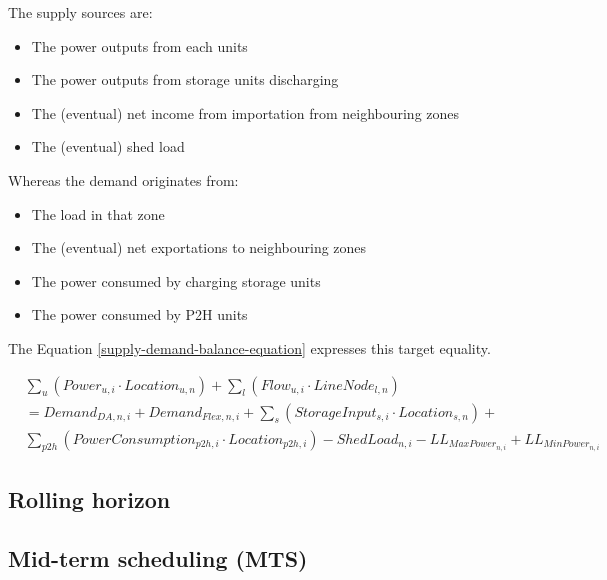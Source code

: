 The supply sources are:
\begin{itemize}
    \item The power outputs from each units 
    \item The power outputs from storage units discharging
    \item The (eventual) net income from importation from neighbouring zones
    \item The (eventual) shed load
\end{itemize}

Whereas the demand originates from:
\begin{itemize}
    \item The load in that zone
    \item The (eventual) net exportations to neighbouring zones
    \item The power consumed by charging storage units
    \item The power consumed by P2H units
\end{itemize}

The Equation \ref{supply-demand-balance-equation} expresses this target equality.

\begin{captionnable}
    \begin{equation}
        \begin{split}
            &\sum_{u} (Power_{u,i} \cdot Location_{u,n}) + \sum_{l} (Flow_{u,i} \cdot LineNode_{l,n})\\
            & = Demand_{DA,n,i} + Demand_{Flex,n,i} + \sum_{s} (StorageInput_{s,i} \cdot Location_{s,n}) + \\
            & \sum_{p2h}(PowerConsumption_{p2h,i} \cdot Location_{p2h,i}) - ShedLoad_{n,i} - LL_{MaxPower_{n,i}} + LL_{MinPower_{n,i}} 		
        \end{split}
        \label{supply-demand-balance-equation}
    \end{equation}
\end{captionnable}

\subsection{Rolling horizon}


\subsection{Mid-term scheduling (MTS)}


